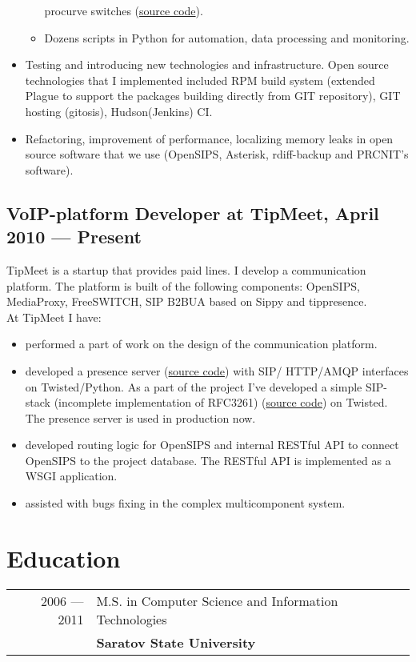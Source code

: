\documentclass[a4paper,10pt]{article}
\begin{document}
\begin{itemize}
\begin{itemize}
procurve switches (\href{http://git.sgu.ru/?p=aaa\_hp.git;a=summary}{source
code}).
 \item Dozens scripts in Python for automation, data processing and monitoring.
 \end{itemize}
\item Testing and introducing new technologies and infrastructure. Open source
technologies that I implemented included RPM build system (extended Plague to
support the packages building directly from GIT repository), GIT hosting
(gitosis), Hudson(Jenkins) CI.
\item Refactoring, improvement of performance, localizing memory leaks in open
source software that we use (OpenSIPS, Asterisk, rdiff-backup and PRCNIT's
software).
\end{itemize}

\subsection{VoIP-platform Developer at TipMeet, April 2010 --- Present}
TipMeet is a startup that provides paid lines. I develop
a communication platform. The platform is built of the following components:
OpenSIPS, MediaProxy, FreeSWITCH, SIP B2BUA based on Sippy and
tippresence.\\
At TipMeet I have:
\begin{itemize}
\item performed a part of work on the design of the communication platform.
\item developed a presence server
(\href{http://github.com/tipmeet/tippresence}{source code}) with SIP\slash
HTTP\slash AMQP interfaces on Twisted\slash Python. As a part of the project
I've developed a simple SIP-stack (incomplete implementation of RFC3261)
(\href{http://github.com/tipmeet/tipsip}{source code}) on
Twisted. The presence server is used in production now.
\item developed routing logic for OpenSIPS and internal RESTful API
to connect OpenSIPS to the project database. The RESTful API is implemented as
a WSGI application.
\item assisted with bugs fixing in the complex multicomponent system.
\end{itemize}


\section{Education}
\begin{tabular}{rl}
2006 --- 2011& M.S. in Computer Science and Information
Technologies \\& \textbf{Saratov State University}
\end{tabular}
\end{document}
